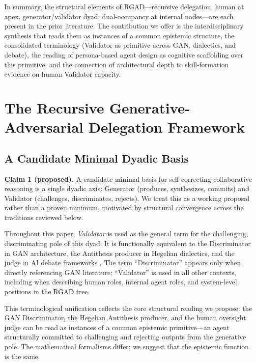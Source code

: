 \documentclass[11pt,a4paper]{article}
\begin{document}
In summary, the structural elements of RGAD---recursive delegation, human at apex, generator/validator dyad, dual-occupancy at internal nodes---are each present in the prior literature. The contribution we offer is the interdisciplinary synthesis that reads them as instances of a common epistemic structure, the consolidated terminology (Validator as primitive across GAN, dialectics, and debate), the reading of persona-based agent design as cognitive scaffolding over this primitive, and the connection of architectural depth to skill-formation evidence on human Validator capacity.

\section{The Recursive Generative-Adversarial Delegation Framework}

\subsection{A Candidate Minimal Dyadic Basis}
\textbf{Claim 1 (proposed).} A candidate minimal basis for self-correcting collaborative reasoning is a single dyadic axis: Generator (produces, synthesizes, commits) and Validator (challenges, discriminates, rejects). We treat this as a working proposal rather than a proven minimum, motivated by structural convergence across the traditions reviewed below.

Throughout this paper, \emph{Validator} is used as the general term for the challenging, discriminating pole of this dyad. It is functionally equivalent to the Discriminator in GAN architecture, the Antithesis producer in Hegelian dialectics, and the judge in AI debate frameworks \citep{goodfellow2014, irving2018}. The term ``Discriminator'' appears only when directly referencing GAN literature; ``Validator'' is used in all other contexts, including when describing human roles, internal agent roles, and system-level positions in the RGAD tree.

This terminological unification reflects the core structural reading we propose: the GAN Discriminator, the Hegelian Antithesis producer, and the human oversight judge can be read as instances of a common epistemic primitive---an agent structurally committed to challenging and rejecting outputs from the generative pole. The mathematical formalisms differ; we suggest that the epistemic function is the same.
\end{document}
